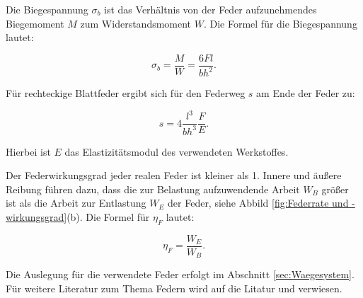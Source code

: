Die Biegespannung $\sigma_b$ ist das Verhältnis von der Feder aufzunehmendes Biegemoment $M$ zum Widerstandsmoment $W$. Die Formel für die Biegespannung lautet:

\begin{equation}
\sigma_b = \frac{M}{W}= \frac{6 F l}{b h^2}.
\label{eq:Biegespannung}
\end{equation}

Für rechteckige Blattfeder ergibt sich für den Federweg $s$ am Ende der Feder zu: 

\begin{equation}
s = 4 \frac{l^3}{b h^3} \frac{F}{E}.
\label{eq:Federweg}
\end{equation}

Hierbei ist $E$ das Elastizitätsmodul des verwendeten Werkstoffes. 

Der Federwirkungsgrad jeder realen Feder ist kleiner als 1. Innere und äußere Reibung führen dazu, dass die zur Belastung aufzuwendende Arbeit $W_B$ größer ist als die Arbeit zur Entlastung $W_E$ der Feder, siehe Abbild \ref{fig:Federrate und -wirkungsgrad}(b). Die Formel für $\eta_F$ lautet:

\begin{equation}
\eta_F = \frac{W_E}{W_B}.
\label{eq:}
\end{equation}

Die Auslegung für die verwendete Feder erfolgt im Abschnitt \ref{sec:Waegesystem}. Für weitere Literatur zum Thema Federn wird auf die Litatur \citep{Wittel2011} und \citep{Ettemeyer2007} verwiesen. 
